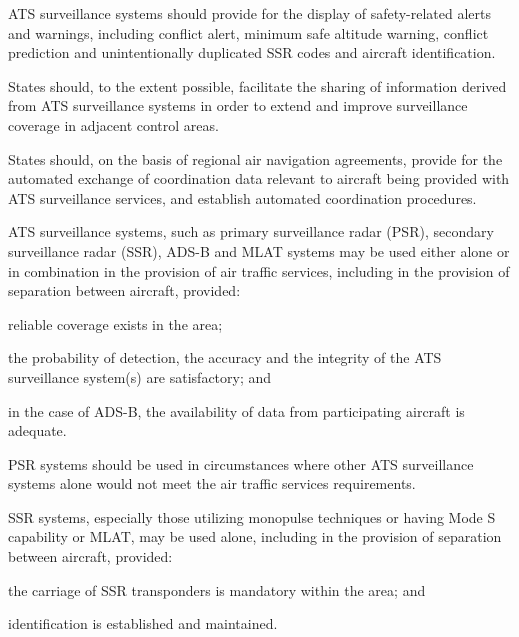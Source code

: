 \begin{enumnoss}
    \item ATS surveillance systems should provide for the display of safety-related alerts and warnings, including conflict alert, minimum safe altitude warning, conflict prediction and unintentionally duplicated SSR codes and aircraft identification.
    \item States should, to the extent possible, facilitate the sharing of information derived from ATS surveillance systems in order to extend and improve surveillance coverage in adjacent control areas.
    \item States should, on the basis of regional air navigation agreements, provide for the automated exchange of coordination data relevant to aircraft being provided with ATS surveillance services, and establish automated coordination procedures.
    \item ATS surveillance systems, such as primary surveillance radar (PSR), secondary surveillance radar (SSR), ADS-B and MLAT systems may be used either alone or in combination in the provision of air traffic services, including in the provision of separation between aircraft, provided:

    \begin{enumalph}
        \item reliable coverage exists in the area;
        \item the probability of detection, the accuracy and the integrity of the ATS surveillance system(s) are satisfactory; and
        \item in the case of ADS-B, the availability of data from participating aircraft is adequate.
    \end{enumalph}

    \item PSR systems should be used in circumstances where other ATS surveillance systems alone would not meet the air traffic services requirements.
    \item SSR systems, especially those utilizing monopulse techniques or having Mode S capability or MLAT, may be used alone, including in the provision of separation between aircraft, provided:

    \begin{enumalph}
        \item the carriage of SSR transponders is mandatory within the area; and
        \item identification is established and maintained.
    \end{enumalph}


\end{enumnoss}
